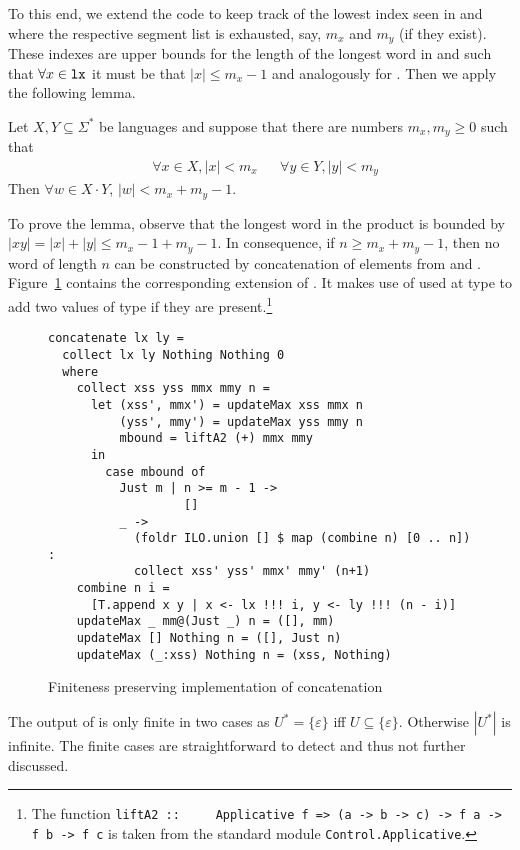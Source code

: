 To this end, we extend the code to keep track of the lowest index
seen in  and  where the respective segment list is
exhausted, say, $m_x$ and $m_y$ (if they exist). These indexes
are upper bounds for the length of the longest word in  and
 such that $\forall x \in \code{lx}$ it must be that
$|x|\le m_x-1$ and analogously for . Then we apply the
following lemma.
\begin{lemma}
  Let $X, Y \subseteq \Sigma^*$ be languages and suppose that there
  are numbers $m_x, m_y \ge 0$ such that
  \begin{align*}
    & \forall x \in X, |x| < m_x
    && \forall y \in Y, |y| < m_y
  \end{align*}
  Then $\forall w\in X\cdot Y$, $|w| < m_x + m_y -1$.
\end{lemma}
To prove the lemma, observe that the longest word in
the product is bounded by $|xy| = |x| + |y| \le m_x -1 + m_y -1$. In
consequence, if $n \ge m_x + m_y - 1$, then no word of
length $n$ can be constructed by concatenation of elements from
 and
. Figure~\ref{fig:finite-concatenation-segmented} contains
the corresponding extension of . It makes use of
 used at type  to add two values of type  if they are present.\footnote{The function \lstinline{liftA2 ::
    Applicative f => (a -> b -> c) -> f a -> f b -> f c} is taken from
the standard module \lstinline{Control.Applicative}.}
\begin{figure}[tp]
\begin{lstlisting}
concatenate lx ly =
  collect lx ly Nothing Nothing 0
  where
    collect xss yss mmx mmy n =
      let (xss', mmx') = updateMax xss mmx n
          (yss', mmy') = updateMax yss mmy n
          mbound = liftA2 (+) mmx mmy
      in
        case mbound of
          Just m | n >= m - 1 ->
                   []
          _ ->
            (foldr ILO.union [] $ map (combine n) [0 .. n]) :
            collect xss' yss' mmx' mmy' (n+1)
    combine n i =
      [T.append x y | x <- lx !!! i, y <- ly !!! (n - i)]
    updateMax _ mm@(Just _) n = ([], mm)
    updateMax [] Nothing n = ([], Just n)
    updateMax (_:xss) Nothing n = (xss, Nothing)
\end{lstlisting}
  \caption{Finiteness preserving implementation of concatenation}
  \label{fig:finite-concatenation-segmented}
\end{figure}

The output of  is only finite in two cases as $U^* = \{\varepsilon\}$ iff
$U\subseteq\{\varepsilon\}$. Otherwise $|U^*|$ is infinite.
The finite cases are straightforward to detect and thus not further discussed.

